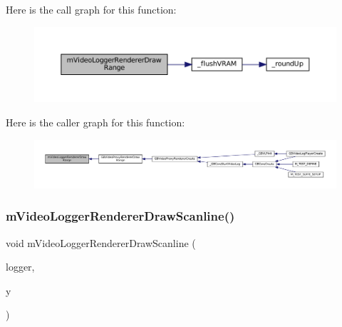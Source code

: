 Here is the call graph for this function\+:
\nopagebreak
\begin{figure}[H]
\begin{center}
\leavevmode
\includegraphics[width=350pt]{video-logger_8c_a4ba6e2f71a9a753f746248d6b0855e7b_cgraph}
\end{center}
\end{figure}
Here is the caller graph for this function\+:
\nopagebreak
\begin{figure}[H]
\begin{center}
\leavevmode
\includegraphics[width=350pt]{video-logger_8c_a4ba6e2f71a9a753f746248d6b0855e7b_icgraph}
\end{center}
\end{figure}
\mbox{\label{video-logger_8c_aae580067601d3fb8deb476d420acf304}} 
\subsubsection{\texorpdfstring{m\+Video\+Logger\+Renderer\+Draw\+Scanline()}{mVideoLoggerRendererDrawScanline()}}
{\footnotesize\ttfamily void m\+Video\+Logger\+Renderer\+Draw\+Scanline (\begin{DoxyParamCaption}\item[{struct m\+Video\+Logger $\ast$}]{logger,  }\item[{\mbox{\hyperlink{ioapi_8h_a787fa3cf048117ba7123753c1e74fcd6}{int}}}]{y }\end{DoxyParamCaption})}

